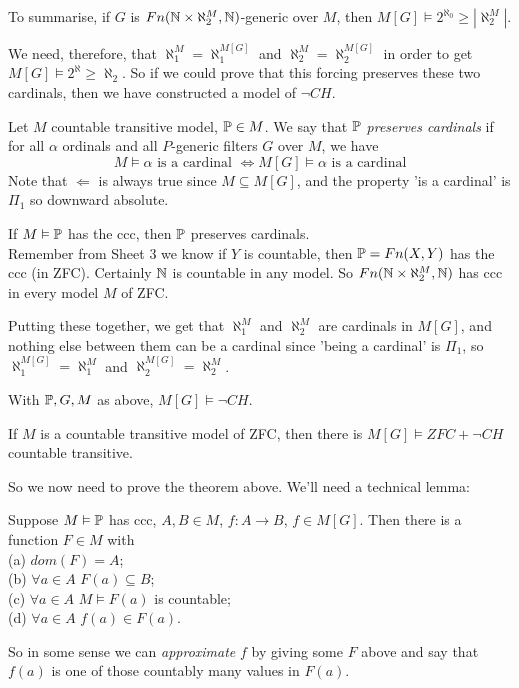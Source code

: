 \documentclass[a4paper]{article}
\begin{document}
To summarise, if $G$ is $Fn(\N \times \aleph_2^M,\N)$-generic over $M$, then $M[G] \vDash 2^{\aleph_0} \geq |\aleph_2^M|$.

We need, therefore, that $\aleph_1^M = \aleph_1^{M[G]}$ and $\aleph_2^M = \aleph_2^{M[G]}$ in order to get $M[G] \vDash 2^\aleph \geq \aleph_2$. So if we could prove that this forcing preserves these two cardinals, then we have constructed a model of $\neg CH$.

\begin{defi}
Let $M$ countable transitive model, $\P \in M$. We say that $\P$ \emph{preserves cardinals} if for all $\alpha$ ordinals and all $P$-generic filters $G$ over $M$, we have
\[
M \vDash \alpha \text{ is a cardinal } \iff M[G] \vDash \alpha \text{ is a cardinal}
\]
Note that $\Leftarrow$ is always true since $M \subseteq M[G]$, and the property 'is a cardinal' is $\Pi_1$ so downward absolute.
\end{defi}

\begin{thm}
If $M \vDash \P$ has the ccc, then $\P$ preserves cardinals.\\
Remember from Sheet 3 we know if $Y$ is countable, then $\P = Fn(X,Y)$ has the ccc (in ZFC). Certainly $\N$ is countable in any model. So $Fn(\N \times \aleph_2^M,\N)$ has ccc in every model $M$ of ZFC.
\end{thm}

Putting these together, we get that $\aleph_1^M$ and $\aleph_2^M$ are cardinals in $M[G]$, and nothing else between them can be a cardinal since 'being a cardinal' is $\Pi_1$, so $\aleph_1^{M[G]} = \aleph_1^M$ and $\aleph_2^{M[G]} = \aleph_2^M$.

\begin{coro}
With $\P,G,M$ as above, $M[G] \vDash \neg CH$.
\end{coro}

\begin{coro}
If $M$ is a countable transitive model of ZFC, then there is $M[G] \vDash ZFC+\neg CH$ countable transitive.
\end{coro}

So we now need to prove the theorem above. We'll need a technical lemma:
\begin{lemma}
Suppose $M \vDash \P$ has ccc, $A,B \in M$, $f:A \to B$, $f \in M[G]$. Then there is a function $F \in M$ with\\
(a) $dom(F) = A$;\\
(b) $\forall a \in A$ $F(a) \subseteq B$;\\
(c) $\forall a \in A$ $M \vDash F(a)$ is countable;\\
(d) $\forall a \in A$ $f(a) \in F(a)$.

So in some sense we can \emph{approximate} $f$ by giving some $F$ above and say that $f(a)$ is one of those countably many values in $F(a)$.
\end{lemma}
\end{document}
